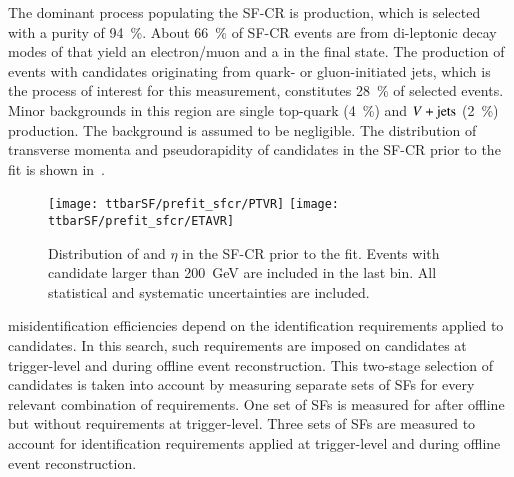 The dominant process populating the SF-CR is \ttbar production, which is
selected with a purity of \SI{94}{\percent}. About \SI{66}{\percent} of SF-CR
events are from di-leptonic decay modes of \ttbar that yield an electron/muon
and a \tauhadvis in the final state. The production of \ttbar events with
\tauhadvis candidates originating from quark- or gluon-initiated jets, which is
the process of interest for this measurement, constitutes \SI{28}{\percent} of
selected events. Minor backgrounds in this region are single top-quark
(\SI{4}{\percent}) and $V+\text{jets}$ (\SI{2}{\percent}) production. The \multijet
background is assumed to be negligible. The distribution of transverse momenta
and pseudorapidity of \tauhadvis candidates in the SF-CR prior to the fit is
shown in~.

\begin{figure}[htbp]
  \centering

  \texttt{[image: ttbarSF/prefit\_sfcr/PTVR]}%
  \texttt{[image: ttbarSF/prefit\_sfcr/ETAVR]}

  \caption[Distribution of \tauhadvis \pT and $\eta$ in the SF-CR.]{Distribution
    of \tauhadvis \pT and $\eta$ in the SF-CR prior to the fit. Events with
    \tauhadvis candidate \pT larger than \SI{200}{\GeV} are included in the last
    bin. All statistical and systematic uncertainties are included.}%
  \label{fig:ttbarSF_prefit_pt}
\end{figure}

\Jettotauhadvis misidentification efficiencies depend on the identification
requirements applied to \tauhadvis candidates. In this search, such requirements
are imposed on \tauhadvis candidates at trigger-level and during offline event
reconstruction. This two-stage selection of \tauhadvis candidates is taken into
account by measuring separate sets of SFs for every relevant combination of
\tauid requirements. One set of SFs is measured for \faketauhadvis after offline
\tauid but without requirements at trigger-level.
Three sets of SFs are measured to account for identification requirements
applied at trigger-level and during offline event reconstruction.

